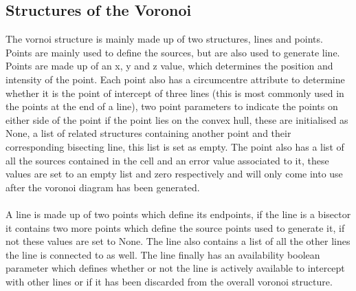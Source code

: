 \subsection{Structures of the Voronoi}
The vornoi structure is mainly made up of two structures, lines and points. Points are mainly used to define the sources, but are also used to generate line. Points are made up of an x, y and z value, which determines the position and intensity of the point. Each point also has a circumcentre attribute to determine whether it is the point of intercept of three lines (this is most commonly used in the points at the end of a line), two point parameters to indicate the points on either side of the point if the point lies on the convex hull, these are initialised as None, a list of related structures containing another point and their corresponding bisecting line, this list is set as empty. The point also has a list of all the sources contained in the cell and an error value associated to it, these values are set to an empty list and zero respectively and will only come into use after the voronoi diagram has been generated.
\\
\\
A line is made up of two points which define its endpoints, if the line is a bisector it contains two more points which define the source points used to generate it, if not these values are set to None. The line also contains a list of all the other lines the line is connected to as well. The line finally has an availability boolean parameter which defines whether or not the line is actively available to intercept with other lines or if it has been discarded from the overall voronoi structure.

